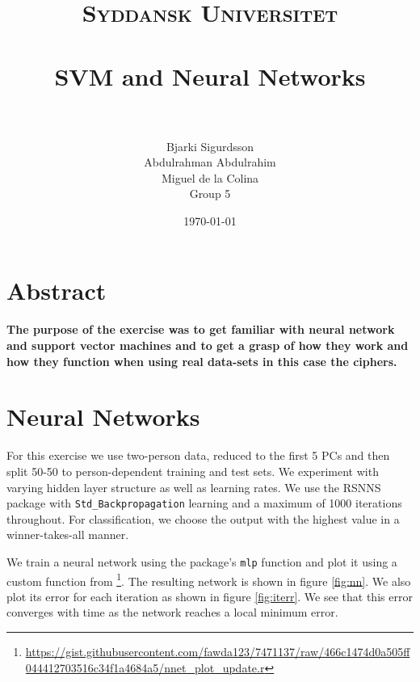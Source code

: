 \documentclass[paper=a4, fontsize=11pt]{scrartcl} %
\title{	
\normalfont \normalsize 
\textsc{Syddansk Universitet} \\ [25pt] 
\horrule{0.5pt} \\[0.4cm] %
\huge SVM and Neural Networks \\ %
\horrule{2pt} \\[0.5cm] %
}
\author{Bjarki Sigurdsson \\ Abdulrahman Abdulrahim \\ Miguel de la Colina \\ Group 5}
\date{\normalsize\today} %
\begin{document}
\maketitle %



\section*{Abstract}

\paragraph{The purpose of the exercise was to get familiar with neural network and support vector machines and to get a grasp of how they work and how they function when using real data-sets in this case the ciphers.}




\section{Neural Networks}
	For this exercise we use two-person data, reduced to the first 5 PCs and then split 50-50 to person-dependent training and test sets. We experiment with varying hidden layer structure as well as learning rates. We use the RSNNS package with \texttt{Std_Backpropagation} learning and a maximum of 1000 iterations throughout. For classification, we choose the output with the highest value in a winner-takes-all manner.\par
	We train a neural network using the package's \texttt{mlp} function and plot it using a custom function from \footnote{\url{https://gist.githubusercontent.com/fawda123/7471137/raw/466c1474d0a505ff044412703516c34f1a4684a5/nnet_plot_update.r}}. The resulting network is shown in figure \ref{fig:nn}. We also plot its error for each iteration as shown in figure \ref{fig:iterr}. We see that this error converges with time as the network reaches a local minimum error.
\end{document}
